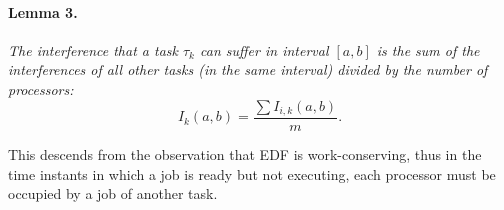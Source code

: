 \documentclass{article}
\begin{document}
\paragraph{Lemma 3.}
\textit{The interference that a task $\tau_k$ can suffer in interval $[a,b]$
is the sum of the interferences of all other tasks (in the same interval)
divided by the number of processors:}
\[
	I_k(a,b) = \frac{\sum I_{i,k}(a,b)}{m}.
\]

This descends from the observation that EDF is work-conserving, thus in the
time instants in which a job is ready but not executing, each processor must be
occupied by a job of another task.
\end{document}
